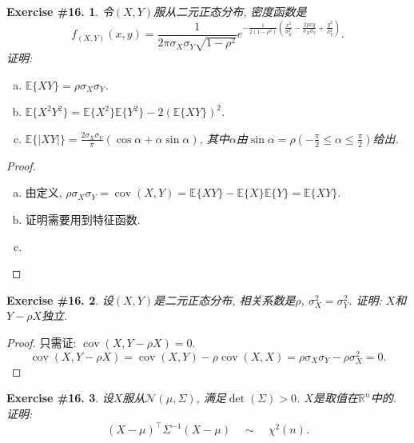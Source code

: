 \documentclass[UTF8, a4paper]{article}
\newtheorem{exercise}{Exercise \#16.}
\begin{document}
\begin{framed}
\begin{exercise}
令\((X,Y)\)服从二元正态分布, 密度函数是
$$
f_{(X, Y)}(x, y)=\frac{1}{2 \pi \sigma_X \sigma_Y \sqrt{1-\rho^2}} e^{-\frac{1}{2\left(1-\rho^2\right)}\left(\frac{x^2}{\sigma_X^2}-\frac{2 \rho x y}{\sigma_X \sigma_Y}+\frac{y^2}{\sigma_Y^2}\right)} .
$$
证明:
\begin{enumerate}[a)]
    \item \(\mathbb{E}\{XY\} = \rho \sigma_X \sigma_Y\).
    \item \(\mathbb{E}\{X^2Y^2\} = \mathbb{E}\{X^2\}\mathbb{E}\{Y^2\} - 2 (\mathbb{E}\{XY\})^2\).
    \item \(\mathbb{E}\{|XY|\} = \frac{2\sigma_X \sigma_Y}{\pi}(\cos\alpha + \alpha \sin\alpha)\), 其中\(\alpha\)由\(\sin\alpha = \rho\left(-\frac{\pi}{2} \leq \alpha \leq \frac{\pi}{2}\right)\)给出.
\end{enumerate}
\end{exercise}
\end{framed}


\begin{proof}
\begin{enumerate}[a)]
    \item 由定义, \(\rho \sigma_X \sigma_Y = \operatorname{cov}(X,Y) = \mathbb{E}\{XY\} - \mathbb{E}\{X\} \mathbb{E}\{Y\} = \mathbb{E}\{XY\}\).
    \item 证明需要用到特征函数.
    \item 
\end{enumerate}
\end{proof}



\begin{framed}
\begin{exercise}
设\((X,Y)\)是二元正态分布, 相关系数是\(\rho\), \(\sigma_X^2 = \sigma_Y^2\).
证明: \(X\)和\(Y - \rho X\)独立.
\end{exercise}
\end{framed}

\begin{proof}
只需证: \(\operatorname{cov}(X, Y - \rho X) = 0\).
$$
\operatorname{cov}(X, Y - \rho X) = \operatorname{cov}(X, Y) - \rho \operatorname{cov}(X, X) = \rho \sigma_X \sigma_Y - \rho \sigma_X^2= 0.
$$
\end{proof}


\begin{framed}
\begin{exercise}
设\(X\)服从\(\mathcal{N}(\mu, \Sigma)\), 满足\(\det(\Sigma) > 0\).
\(X\)是取值在\(\mathbb{R}^n\)中的.
证明:
$$
(X-\mu)^\top \Sigma^{-1}(X-\mu)\quad  \sim \quad \chi^2(n) .
$$
\end{exercise}
\end{framed}
\end{document}
